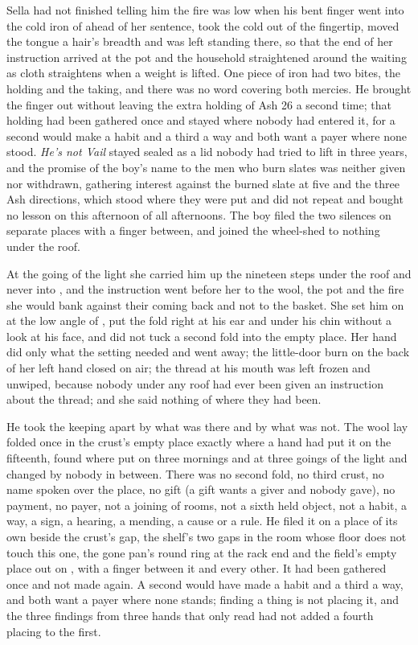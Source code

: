 Sella had not finished telling him the fire was low when his bent finger went into the cold iron of  ahead of her sentence, took the cold out of the fingertip, moved the tongue a hair's breadth and was left standing there, so that the end of her instruction arrived at the pot and the household straightened around the waiting as cloth straightens when a weight is lifted. One piece of iron had two bites, the holding and the taking, and there was no  word covering both mercies. He brought the finger out without leaving the extra holding of Ash 26 a second time; that holding had been gathered once and stayed where nobody had entered it, for a second would make a habit and a third a way and both want a payer where none stood. \emph{He's not Vail} stayed sealed as a lid nobody had tried to lift in three years, and the promise of the boy's name to the men who burn slates was neither given nor withdrawn, gathering interest against the burned slate at five and the three Ash directions, which stood where they were put and did not repeat and bought no lesson on this afternoon of all afternoons. The boy filed the two silences on separate places with a finger between, and joined the wheel-shed to nothing under the roof.

\scenebreak

At the going of the light she carried him up the nineteen steps under the roof and never into , and the instruction went before her to the wool, the pot and the fire she would bank against their coming back and not to the basket. She set him on  at the low angle of , put the fold right at his ear and under his chin without a look at his face, and did not tuck a second fold into the empty place. Her hand did only what the setting needed and went away; the little-door burn on the back of her left hand closed on air; the thread at his mouth was left frozen and unwiped, because nobody under any roof had ever been given an instruction about the thread; and she said nothing of where they had been.

He took the keeping apart by what was there and by what was not. The wool lay folded once in the crust's empty place exactly where a hand had put it on the fifteenth, found where put on three mornings and at three goings of the light and changed by nobody in between. There was no second fold, no third crust, no name spoken over the place, no gift (a gift wants a giver and nobody gave), no payment, no payer, not a joining of rooms, not a sixth held object, not a habit, a way, a sign, a hearing, a mending, a cause or a rule. He filed it on a place of its own beside the crust's gap, the shelf's two gaps in the room whose floor does not touch this one, the gone pan's round ring at the rack end and the field's empty place out on , with a finger between it and every other. It had been gathered once and not made again. A second would have made a habit and a third a way, and both want a payer where none stands; finding a thing is not placing it, and the three findings from three hands that only read had not added a fourth placing to the first.

